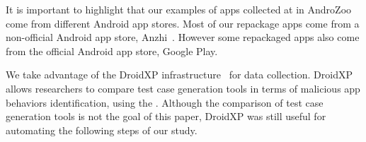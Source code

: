 It is important to highlight that our examples of apps collected at in AndroZoo come from different Android app stores. Most of our repackage apps come from a non-official Android app store, Anzhi~\cite{anzhi}. However some repackaged apps also come from the official Android app store, Google Play.






We take advantage of the DroidXP infrastructure~\cite{DBLP:conf/scam/CostaMCMVBC20}
for data collection. DroidXP allows researchers to compare 
test case generation tools in terms of malicious app behaviors identification, using the \mas. Although the comparison of test
case generation tools is not the goal of this paper, DroidXP
was still useful for automating the following steps of our study.


